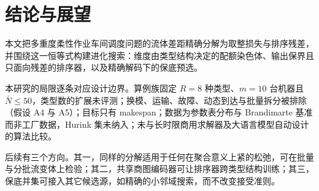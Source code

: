 \section{结论与展望}\label{sec:conclusion}
本文把多重度柔性作业车间调度问题的流体差距精确分解为取整损失与排序残差，并围绕这一恒等式构建进化搜索：维度由类型结构决定的配额染色体、输出保界且只面向残差的排序器，以及精确解码下的保底预选。

本研究的局限逐条对应设计边界。算例族固定 $R = 8$ 种类型、$m = 10$ 台机器且 $\bar N \le 50$，类型数的扩展未评测；换模、运输、故障、动态到达与批量拆分被排除（假设 A4 与 A5）；目标只有 makespan；数据为参数表分布与 Brandimarte 基准而非工厂数据，Hurink 集未纳入；未与长时限商用求解器及大语言模型自动设计的算法比较。

后续有三个方向。其一，同样的分解适用于任何在聚合意义上紧的松弛，可在批量与分批流变体上检验；其二，共享商图编码器可让排序器跨类型结构训练；其三，保底并集可接入其它候选源，如精确的小邻域搜索，而不改变接受准则。
